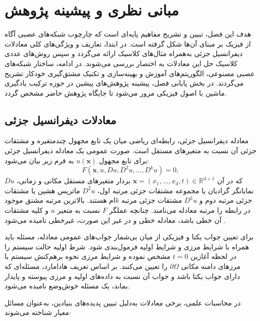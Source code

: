 \chapter{مبانی نظری و پیشینه پژوهش}
\label{ch:background}

هدف این فصل، تبیین و تشریح مفاهیم پایه‌ای است که چارچوب شبکه‌های عصبی آگاه از فیزیک بر مبنای آن‌ها شکل گرفته است. در ابتدا، تعاریف و ویژگی‌های کلی معادلات دیفرانسیل جزئی به‌همراه مثال‌های کلاسیک ارائه می‌گردد و سپس روش‌های عددی کلاسیک حل این معادلات به اختصار بررسی می‌شوند. در ادامه، ساختار شبکه‌های عصبی مصنوعی، الگوریتم‌های آموزش و بهینه‌سازی و تکنیک مشتق‌گیری خودکار تشریح می‌گردند. در بخش پایانی فصل، پیشینه پژوهش‌های پیشین در حوزه ترکیب یادگیری ماشین با اصول فیزیکی مرور می‌شود تا جایگاه پژوهش حاضر مشخص گردد.

\section{معادلات دیفرانسیل جزئی}
\label{sec:pde}

معادله دیفرانسیل جزئی، رابطه‌ای ریاضی میان یک تابع مجهول چندمتغیره و مشتقات جزئی آن نسبت به متغیرهای مستقل است. صورت عمومی یک معادله دیفرانسیل جزئی برای تابع مجهول $u(\mathbf{x})$ به فرم زیر بیان می‌شود:
\begin{equation}
F\left(\mathbf{x}, u, Du, D^2u, \dots, D^ku\right) = 0,
\label{eq:pde-general}
\end{equation}
که در آن $\mathbf{x} = (x_1, \dots, x_d, t) \in \mathbb{R}^{d+1}$ بردار متغیرهای مستقل مکانی و زمانی، $Du$ نمایانگر گرادیان یا مجموعه مشتقات جزئی مرتبه اول، $D^2u$ ماتریس هشین یا مشتقات جزئی مرتبه دوم و $D^ku$ مشتقات جزئی مرتبه $k$ام هستند. بالاترین مرتبه مشتق موجود در رابطه را مرتبه معادله می‌نامند. چنانچه عملگر $F$ نسبت به متغیر $u$ و کلیه مشتقات آن خطی باشد، معادله خطی و در غیر این صورت، غیرخطی نامیده می‌شود \cite{evans2010}.

برای تعیین جواب یکتا و فیزیکی از میان بی‌شمار جواب‌های عمومی معادله، مسئله باید همراه با شرایط مرزی و شرایط اولیه فرمول‌بندی شود. شرط اولیه حالت سیستم را در لحظه آغازین $t=0$ مشخص نموده و شرایط مرزی نحوه برهم‌کنش سیستم با مرزهای دامنه مکانی $\partial\Omega$ را تعیین می‌کنند. بر اساس تعریف هادامارد، مسئله‌ای که دارای جواب یکتا باشد و جواب آن نسبت به داده‌های اولیه و مرزی پیوسته و پایدار بماند، یک مسئله خوش‌وضع نامیده می‌شود.

در محاسبات علمی، برخی معادلات به‌دلیل تبیین پدیده‌های بنیادین، به‌عنوان مسائل معیار شناخته می‌شوند:

